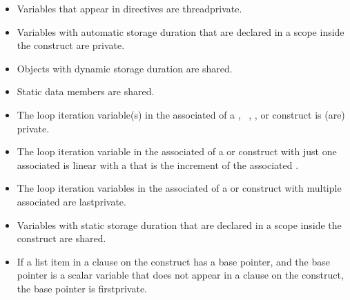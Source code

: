 \begin{ccppspecific}
\begin{itemize}
\item Variables that appear in  directives are threadprivate.
\item Variables with automatic storage duration that are declared in a scope 
      inside the construct are private.
\item Objects with dynamic storage duration are shared.
\item Static data members are shared.
\item The loop iteration variable(s) in the associated  of a
      , ~, , or 
       construct is (are) private.
\item The loop iteration variable in the associated  of a
       or  construct with just one associated 
       is linear with a  that is the increment 
      of the associated .
\item The loop iteration variables in the associated  of a
       or  construct with multiple associated 
       are lastprivate.
\item Variables with static storage duration that are declared in a scope 
      inside the construct are shared.
\item If a list item in a  clause on the  construct 
      has a base pointer, and the base pointer is a scalar variable that 
      does not appear in a  clause on the construct, the base 
      pointer is firstprivate.
\end{itemize}
\end{ccppspecific}

